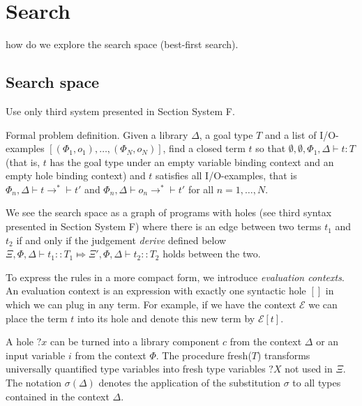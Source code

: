 \section{Search}
how do we explore the search space (best-first search).
\subsection{Search space}\label{Search space}
Use only third system presented in Section System F.

Formal problem definition. Given a library $\Delta$, a goal type $T$ and a list of I/O-examples $[(\Phi_1, o_1), \ldots , (\Phi_N, o_N)]$, find a closed term $t$ so that $\emptyset, \emptyset, \Phi_1, \Delta \vdash t : T$ (that is, $t$ has the goal type under an empty variable binding context and an empty hole binding context) and $t$ satisfies all I/O-examples, that is $\Phi_n, \Delta \vdash t \longrightarrow^* \vdash t'$ and $\Phi_n, \Delta \vdash o_n \longrightarrow^* \vdash t'$ for all $n = 1, \ldots, N$.

We see the search space as a graph of programs with holes (see third syntax presented in Section System F) where there is an edge between two terms $t_1$ and $t_2$ if and only if the judgement \emph{derive} defined below $\Xi, \Phi, \Delta \vdash t_1 :: T_1 \Mapsto \Xi', \Phi, \Delta \vdash t_2 :: T_2$ holds between the two.

To express the rules in a more compact form, we introduce \emph{evaluation contexts}. An evaluation context is an expression with exactly one syntactic hole $[]$ in which we can plug in any term. For example, if we have the context $\mathcal{E}$ we can place the term $t$ into its hole and denote this new term by $\mathcal{E}[t]$.

A hole $?x$ can be turned into a library component $c$ from the context $\Delta$ or an input variable $i$ from the context $\Phi$. The procedure fresh($T$) transforms universally quantified type variables into fresh type variables $?X$ not used in $\Xi$.
The notation $\sigma(\Delta)$ denotes the application of the substitution $\sigma$ to all types contained in the context $\Delta$.

\begin{prooftree}
\end{prooftree}

